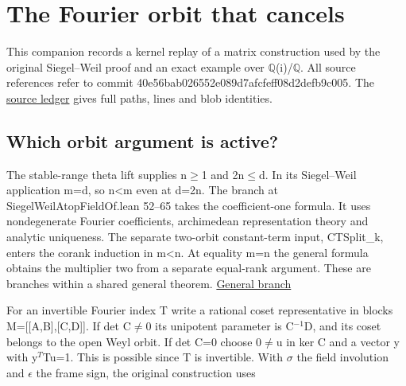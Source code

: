 \documentclass[11pt,letterpaper]{article}
\begin{document}
\appendix
\clearpage\section{The Fourier orbit that cancels}
This companion records a kernel replay of a matrix construction used by the original Siegel–Weil proof and an exact example over \ensuremath{\mathbb{Q}}(i)/\ensuremath{\mathbb{Q}}. All source references refer to commit {\ttfamily\small 40e56bab026552\allowbreak{}e089d7afcfeff0\allowbreak{}8d2defb9c005}. The \href{https://github.com/nousentllc/riemann-hypothesis/blob/2c03d15e908bcbe4aae3c94a87c7ada402cd7911/research/uriel/experiments/siegel-weil-constant-term/source_trace.json}{source ledger} gives full paths, lines and blob identities.

\subsection{Which orbit argument is active?}
The stable-range theta lift supplies n\ensuremath{\ge}1 and 2n\ensuremath{\le}d. In its Siegel–Weil application m=d, so n<m even at d=2n. The branch at {\ttfamily\small SiegelWeilAtopFieldOf.\allowbreak{}lean} 52–65 takes the coefficient-one formula. It uses nondegenerate Fourier coefficients, archimedean representation theory and analytic uniqueness. The separate two-orbit constant-term input, {\ttfamily\small CTSplit\_\allowbreak{}k}, enters the corank induction in m<n. At equality m=n the general formula obtains the multiplier two from a separate equal-rank argument. These are branches within a shared general theorem. \href{https://github.com/nousentllc/riemann-hypothesis/blob/40e56bab026552e089d7afcfeff08d2defb9c005/src/Development/AutomorphicArithmetic/Foundations/GaloisRepresentations/ThetaParseval/ThetaKernels/SiegelWeilAtopFieldOf.lean\#L52-L65}{General branch}

For an invertible Fourier index T write a rational coset representative in blocks M=[[A,B],[C,D]]. If det C\ensuremath{\ne}0 its unipotent parameter is C\ensuremath{{}^{-1}}D, and its coset belongs to the open Weyl orbit. If det C=0 choose 0\ensuremath{\ne}u in ker C and a vector y with y\ensuremath{{}^{T}}Tu=1. This is possible since T is invertible. With \ensuremath{\sigma} the field involution and \ensuremath{\epsilon} the frame sign, the original construction uses
\end{document}
